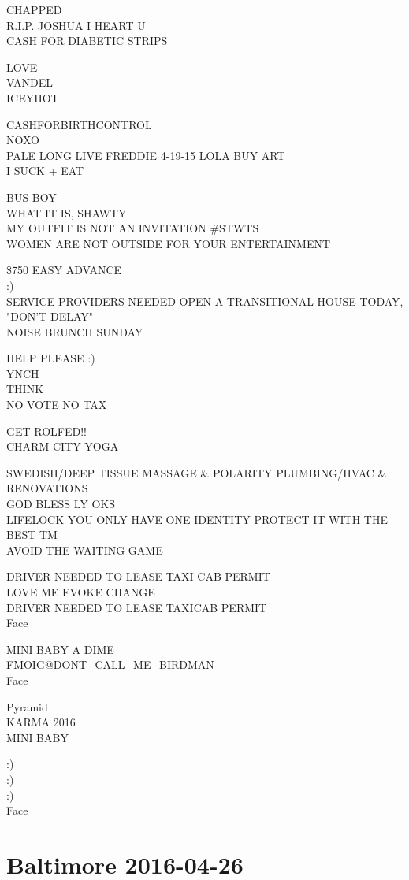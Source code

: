 \documentclass[10pt,letterpaper]{article}
\begin{document}
CHAPPED\\
R.I.P. JOSHUA I HEART U\\
CASH FOR DIABETIC STRIPS

LOVE\\
VANDEL\\
ICEYHOT

CASHFORBIRTHCONTROL\\
NOXO\\
PALE LONG LIVE FREDDIE 4{-}19{-}15 LOLA BUY ART\\
I SUCK + EAT

BUS BOY\\
WHAT IT IS, SHAWTY\\
MY OUTFIT IS NOT AN INVITATION \#STWTS\\
WOMEN ARE NOT OUTSIDE FOR YOUR ENTERTAINMENT

\$750 EASY ADVANCE\\
:)\\
SERVICE PROVIDERS NEEDED OPEN A TRANSITIONAL HOUSE TODAY, "DON'T DELAY"\\
NOISE BRUNCH SUNDAY

HELP PLEASE :)\\
YNCH\\
THINK\\
NO VOTE NO TAX

GET ROLFED!!\\
CHARM CITY YOGA

SWEDISH/DEEP TISSUE MASSAGE \& POLARITY PLUMBING/HVAC \& RENOVATIONS\\
GOD BLESS LY OKS\\
LIFELOCK YOU ONLY HAVE ONE IDENTITY PROTECT IT WITH THE BEST TM\\
AVOID THE WAITING GAME

DRIVER NEEDED TO LEASE TAXI CAB PERMIT\\
LOVE ME EVOKE CHANGE\\
DRIVER NEEDED TO LEASE TAXICAB PERMIT\\
Face

MINI BABY A DIME\\
FMOIG@DONT\_CALL\_ME\_BIRDMAN\\
Face

Pyramid\\
KARMA 2016\\
MINI BABY

:)\\
:)\\
:)\\
Face
\

\section*{Baltimore 2016-04-26}
\end{document}
